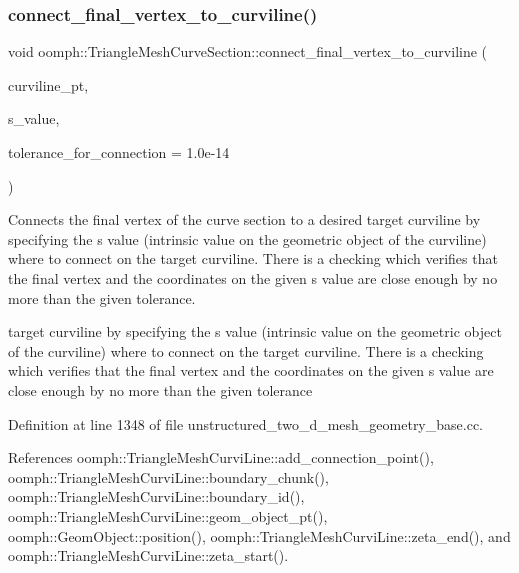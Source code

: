 \subsubsection{\texorpdfstring{connect\+\_\+final\+\_\+vertex\+\_\+to\+\_\+curviline()}{connect\_final\_vertex\_to\_curviline()}}
{\footnotesize\ttfamily void oomph\+::\+Triangle\+Mesh\+Curve\+Section\+::connect\+\_\+final\+\_\+vertex\+\_\+to\+\_\+curviline (\begin{DoxyParamCaption}\item[{\hyperlink{classoomph_1_1TriangleMeshCurviLine}{Triangle\+Mesh\+Curvi\+Line} $\ast$}]{curviline\+\_\+pt,  }\item[{const double \&}]{s\+\_\+value,  }\item[{const double \&}]{tolerance\+\_\+for\+\_\+connection = {\ttfamily 1.0e-\/14} }\end{DoxyParamCaption})}



Connects the final vertex of the curve section to a desired target curviline by specifying the s value (intrinsic value on the geometric object of the curviline) where to connect on the target curviline. There is a checking which verifies that the final vertex and the coordinates on the given s value are close enough by no more than the given tolerance. 

target curviline by specifying the s value (intrinsic value on the geometric object of the curviline) where to connect on the target curviline. There is a checking which verifies that the final vertex and the coordinates on the given s value are close enough by no more than the given tolerance 

Definition at line 1348 of file unstructured\+\_\+two\+\_\+d\+\_\+mesh\+\_\+geometry\+\_\+base.\+cc.



References oomph\+::\+Triangle\+Mesh\+Curvi\+Line\+::add\+\_\+connection\+\_\+point(), oomph\+::\+Triangle\+Mesh\+Curvi\+Line\+::boundary\+\_\+chunk(), oomph\+::\+Triangle\+Mesh\+Curvi\+Line\+::boundary\+\_\+id(), oomph\+::\+Triangle\+Mesh\+Curvi\+Line\+::geom\+\_\+object\+\_\+pt(), oomph\+::\+Geom\+Object\+::position(), oomph\+::\+Triangle\+Mesh\+Curvi\+Line\+::zeta\+\_\+end(), and oomph\+::\+Triangle\+Mesh\+Curvi\+Line\+::zeta\+\_\+start().

\mbox{\label{classoomph_1_1TriangleMeshCurveSection_a55d06c515fd1e7f6a3729b2efda06c38}} 
